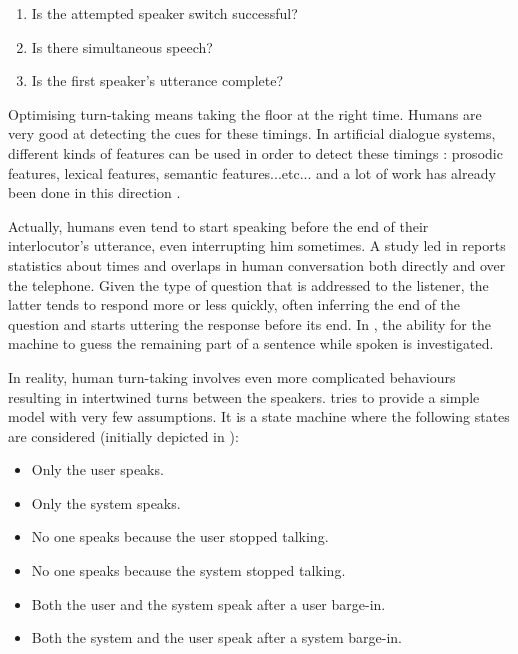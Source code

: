         \begin{enumerate}
            \item Is the attempted speaker switch successful?
            \item Is there simultaneous speech?
            \item Is the first speaker's utterance complete?
        \end{enumerate}
        
        Optimising turn-taking means taking the floor at the right time. Humans are very good at detecting the cues for these timings. In artificial dialogue systems, different kinds of features can be used in order to detect these timings \cite{Gravano2011}: prosodic features, lexical features, semantic features...etc... and a lot of work has already been done in this direction \cite{Raux2008,Jonsdottir2008,Meena2013}.

        Actually, humans even tend to start speaking before the end of their interlocutor's utterance, even interrupting him sometimes. A study led in \cite{Strombergsson2013} reports statistics about times and overlaps in human conversation both directly and over the telephone. Given the type of question that is addressed to the listener, the latter tends to respond more or less quickly, often inferring the end of the question and starts uttering the response before its end. In \cite{DeVault2011}, the ability for the machine to guess the remaining part of a sentence while spoken is investigated.
				
        In reality, human turn-taking involves even more complicated behaviours resulting in intertwined turns between the speakers. \cite{Raux2009} tries to provide a simple model with very few assumptions. It is a state machine where the following states are considered (initially depicted in \cite{Jaffe1970}):

        \begin{itemize}
          \item Only the user speaks.
          \item Only the system speaks.
          \item No one speaks because the user stopped talking.
          \item No one speaks because the system stopped talking.
          \item Both the user and the system speak after a user barge-in.
          \item Both the system and the user speak after a system barge-in.
        \end{itemize}
				
